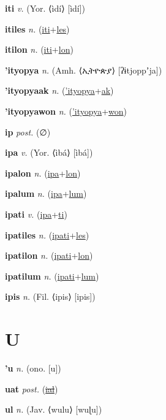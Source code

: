 \textbf{\hypertarget{iti}{iti}} \textit{v.} (Yor. ⟨ìdí⟩ [ìdí])


\textbf{\hypertarget{itiles}{itiles}} \textit{n.} (\hyperlink{iti}{iti}+\allowbreak \hyperlink{les}{les})


\textbf{\hypertarget{itilon}{itilon}} \textit{n.} (\hyperlink{iti}{iti}+\allowbreak \hyperlink{lon}{lon})


\textbf{\hypertarget{'ityopya}{'ityopya}} \textit{n.} (Amh. ⟨{\ethiopic{}ኢትዮጵያ}⟩ [ʔɨtjoppʼja])


\textbf{\hypertarget{'ityopyaak}{'ityopyaak}} \textit{n.} (\hyperlink{'ityopya}{'ityopya}+\allowbreak \hyperlink{ak}{ak})


\textbf{\hypertarget{'ityopyawon}{'ityopyawon}} \textit{n.} (\hyperlink{'ityopya}{'ityopya}+\allowbreak \hyperlink{won}{won})


\textbf{\hypertarget{ip}{ip}} \textit{post.} (∅)


\textbf{\hypertarget{ipa}{ipa}} \textit{v.} (Yor. ⟨ìbá⟩ [ìbá])


\textbf{\hypertarget{ipalon}{ipalon}} \textit{n.} (\hyperlink{ipa}{ipa}+\allowbreak \hyperlink{lon}{lon})


\textbf{\hypertarget{ipalum}{ipalum}} \textit{n.} (\hyperlink{ipa}{ipa}+\allowbreak \hyperlink{lum}{lum})


\textbf{\hypertarget{ipati}{ipati}} \textit{v.} (\hyperlink{ipa}{ipa}+\allowbreak \hyperlink{ti}{ti})


\textbf{\hypertarget{ipatiles}{ipatiles}} \textit{n.} (\hyperlink{ipati}{ipati}+\allowbreak \hyperlink{les}{les})


\textbf{\hypertarget{ipatilon}{ipatilon}} \textit{n.} (\hyperlink{ipati}{ipati}+\allowbreak \hyperlink{lon}{lon})


\textbf{\hypertarget{ipatilum}{ipatilum}} \textit{n.} (\hyperlink{ipati}{ipati}+\allowbreak \hyperlink{lum}{lum})


\textbf{\hypertarget{ipis}{ipis}} \textit{n.} (Fil. ⟨ipis⟩ [ipis])


\section{U}

\textbf{\hypertarget{'u}{'u}} \textit{n.} (ono. [u])


\textbf{\hypertarget{uat}{uat}} \textit{post.} (\hyperlink{ial}{\sout{ial}})


\textbf{\hypertarget{ul}{ul}} \textit{n.} (Jav. ⟨wulu⟩ [wuɭu])


